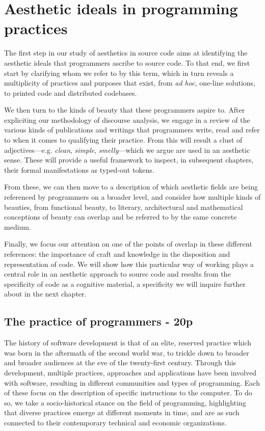 \chapter{Aesthetic ideals in programming practices}

The first step in our study of aesthetics in source code aims at identifying the aesthetic ideals that programmers ascribe to source code. To that end, we first start by clarifying whom we refer to by this term, which in turn reveals a multiplicity of practices and purposes that exist, from \emph{ad hoc}, one-line solutions, to printed code and distributed codebases.

We then turn to the kinds of beauty that these programmers aspire to. After expliciting our methodology of discourse analysis, we engage in a review of the various kinds of publications and writings that programmers write, read and refer to when it comes to qualifying their practice. From this will result a clust of adjectives—e.g. \emph{clean}, \emph{simple}, \emph{smelly}—which we argue are used in an aesthetic sense. These will provide a useful framework to inspect, in subsequent chapters, their formal manifestations as typed-out tokens.

From these, we can then move to a description of which aesthetic fields are being referenced by programmers on a broader level, and consider how multiple kinds of beauties, from functional beauty, to literary, architectural and mathematical conceptions of beauty can overlap and be referred to by the same concrete medium.

Finally, we focus our attention on one of the points of overlap in these different references: the importance of craft and knowledge in the disposition and representation of code. We will show how this particular way of working  plays a central role in an aesthetic approach to sourec code and results from the specificity of code as a cognitive material, a specificity we will inquire further about in the next chapter.

\section{The practice of programmers - 20p}

The history of software development is that of an elite, reserved practice which was born in the aftermath of the second world war, to trickle down to broader and broader audiences at the eve of the twenty-first century. Through this development, multiple practices, approaches and applications have been involved with software, resulting in different communities and types of programming. Each of these focus on the description of specific instructions to the computer. To do so, we take a socio-historical stance on the field of programming, highlighting that diverse practices emerge at different moments in time, and are as such connected to their contemporary technical and economic organizations.

